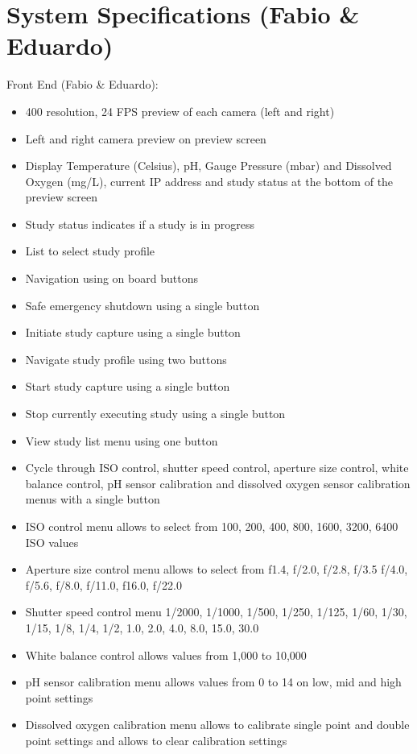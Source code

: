 \section{System Specifications (Fabio \& Eduardo)}
Front End (Fabio \& Eduardo):
\begin{itemize}
	\item 400 resolution, 24 FPS preview of each camera (left and right)
	\item Left and right camera preview on preview screen
	\item Display Temperature (Celsius), pH, Gauge Pressure (mbar) and Dissolved Oxygen (mg/L), current IP address and study status at the bottom of the preview screen
	\item Study status indicates if a study is in progress
	\item List to select study profile
	\item Navigation using on board buttons
	\item Safe emergency shutdown using a single button
	\item Initiate study capture using a single button
	\item Navigate study profile using two buttons
	\item Start study capture using a single button
	\item Stop currently executing study using a single button
	\item View study list menu using one button
	\item Cycle through ISO control, shutter speed control, aperture size control, white balance control, pH sensor calibration and dissolved oxygen sensor calibration menus with a single button
	\item ISO control menu allows to select from 100, 200, 400, 800, 1600, 3200, 6400 ISO values
	\item Aperture size control menu allows to select from f1.4, f/2.0, f/2.8, f/3.5 f/4.0, f/5.6, f/8.0, f/11.0, f16.0, f/22.0
	\item Shutter speed control menu 1/2000, 1/1000, 1/500, 1/250, 1/125, 1/60, 1/30, 1/15, 1/8, 1/4, 1/2, 1.0, 2.0, 4.0, 8.0, 15.0, 30.0
	\item White balance control allows values from 1,000 to 10,000
	\item pH sensor calibration menu allows values from 0 to 14 on low, mid and high point settings
	\item Dissolved oxygen calibration menu allows to calibrate single point and double point settings and allows to clear calibration settings
\end{itemize}
